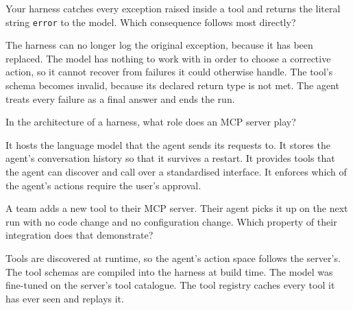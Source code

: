 \begin{questions}
\qitem Your harness catches every exception raised inside a tool and returns the literal string
\texttt{error} to the model. Which consequence follows most directly?
\begin{choices}
  \choice The harness can no longer log the original exception, because it has been replaced.
  \CorrectChoice The model has nothing to work with in order to choose a corrective action, so it cannot recover from failures it could otherwise handle.
  \choice The tool's schema becomes invalid, because its declared return type is not met.
  \choice The agent treats every failure as a final answer and ends the run.
\end{choices}
\dontknow
{}

\qitem In the architecture of a harness, what role does an MCP server play?
\begin{choices}
  \choice It hosts the language model that the agent sends its requests to.
  \choice It stores the agent's conversation history so that it survives a restart.
  \CorrectChoice It provides tools that the agent can discover and call over a standardised interface.
  \choice It enforces which of the agent's actions require the user's approval.
\end{choices}
\dontknow
{}

\qitem A team adds a new tool to their MCP server. Their agent picks it up on the next run with no code
change and no configuration change. Which property of their integration does that demonstrate?
\begin{choices}
  \CorrectChoice Tools are discovered at runtime, so the agent's action space follows the server's.
  \choice The tool schemas are compiled into the harness at build time.
  \choice The model was fine-tuned on the server's tool catalogue.
  \choice The tool registry caches every tool it has ever seen and replays it.
\end{choices}
\dontknow
{}


\end{questions}
